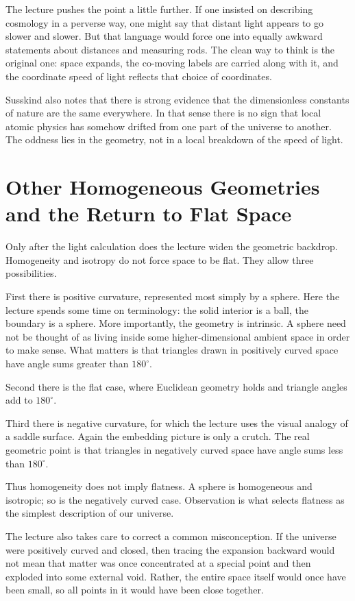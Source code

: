 The lecture pushes the point a little further. If one insisted on describing cosmology in a perverse way, one might say that distant light appears to go slower and slower. But that language would force one into equally awkward statements about distances and measuring rods. The clean way to think is the original one: space expands, the co-moving labels are carried along with it, and the coordinate speed of light reflects that choice of coordinates.

Susskind also notes that there is strong evidence that the dimensionless constants of nature are the same everywhere. In that sense there is no sign that local atomic physics has somehow drifted from one part of the universe to another. The oddness lies in the geometry, not in a local breakdown of the speed of light.

\section{Other Homogeneous Geometries and the Return to Flat Space}

Only after the light calculation does the lecture widen the geometric backdrop. Homogeneity and isotropy do not force space to be flat. They allow three possibilities.

First there is positive curvature, represented most simply by a sphere. Here the lecture spends some time on terminology: the solid interior is a ball, the boundary is a sphere. More importantly, the geometry is intrinsic. A sphere need not be thought of as living inside some higher-dimensional ambient space in order to make sense. What matters is that triangles drawn in positively curved space have angle sums greater than \(180^\circ\).

Second there is the flat case, where Euclidean geometry holds and triangle angles add to \(180^\circ\).

Third there is negative curvature, for which the lecture uses the visual analogy of a saddle surface. Again the embedding picture is only a crutch. The real geometric point is that triangles in negatively curved space have angle sums less than \(180^\circ\).

Thus homogeneity does not imply flatness. A sphere is homogeneous and isotropic; so is the negatively curved case. Observation is what selects flatness as the simplest description of our universe.

The lecture also takes care to correct a common misconception. If the universe were positively curved and closed, then tracing the expansion backward would not mean that matter was once concentrated at a special point and then exploded into some external void. Rather, the entire space itself would once have been small, so all points in it would have been close together.


